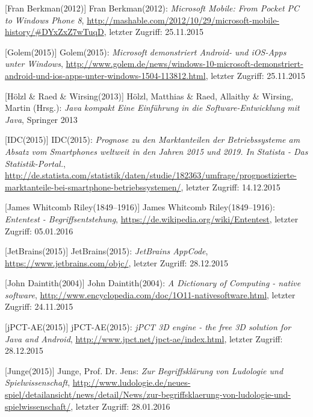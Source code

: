 \begin{thebibliography}{}
[Fran Berkman(2012)] Fran Berkman(2012): \emph{Microsoft Mobile: From Pocket PC to Windows Phone 8},
\url{http://mashable.com/2012/10/29/microsoft-mobile-history/#DYxZxZ7wTuqD}, letzter Zugriff: 25.11.2015

[Golem(2015)] Golem(2015): \emph{Microsoft demonstriert Android- und iOS-Apps unter Windows},
\url{http://www.golem.de/news/windows-10-microsoft-demonstriert-android-und-ios-apps-unter-windows-1504-113812.html}, letzter Zugriff: 25.11.2015

[Hölzl \& Raed \& Wirsing(2013)] Hölzl, Matthias \& Raed, Allaithy \& Wirsing, Martin (Hrsg.): 
\emph{Java kompakt Eine Einführung in die Software-Entwicklung
	mit Java}, Springer 2013

[IDC(2015)] IDC(2015): \emph{Prognose zu den Marktanteilen der Betriebssysteme am Absatz vom Smartphones weltweit in den Jahren 2015 und 2019. In Statista - Das Statistik-Portal.},
\url{http://de.statista.com/statistik/daten/studie/182363/umfrage/prognostizierte-marktanteile-bei-smartphone-betriebssystemen/}, letzter Zugriff: 14.12.2015

[James Whitcomb Riley(1849–1916)] James Whitcomb Riley(1849–1916): \emph{Ententest - Begriffsentstehung},
\url{https://de.wikipedia.org/wiki/Ententest}, letzter Zugriff: 05.01.2016

[JetBrains(2015)] JetBrains(2015): \emph{JetBrains AppCode},
\url{https://www.jetbrains.com/objc/}, letzter Zugriff: 28.12.2015

[John Daintith(2004)] John Daintith(2004): \emph{A Dictionary of Computing - native software},
\url{http://www.encyclopedia.com/doc/1O11-nativesoftware.html}, letzter Zugriff: 24.11.2015

[jPCT-AE(2015)] jPCT-AE(2015): \emph{jPCT 3D engine - the free 3D solution for Java and Android},
\url{http://www.jpct.net/jpct-ae/index.html}, letzter Zugriff: 28.12.2015

[Junge(2015)] Junge, Prof. Dr. Jens:
\emph{Zur Begriffsklärung von Ludologie und Spielwissenschaft},
\url{http://www.ludologie.de/neues-spiel/detailansicht/news/detail/News/zur-begriffsklaerung-von-ludologie-und-spielwissenschaft/}, letzter Zugriff: 28.01.2016


\end{thebibliography}
